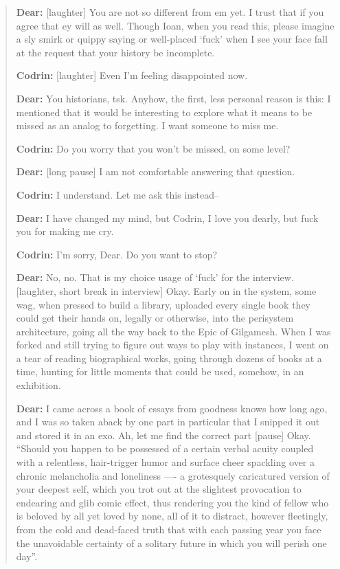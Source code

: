 \begin{quote}
\textbf{Dear:} {[}laughter{]} You are not so different from em yet. I trust that if you agree that ey will as well. Though Ioan, when you read this, please imagine a sly smirk or quippy saying or well-placed `fuck' when I see your face fall at the request that your history be incomplete.

\textbf{Codrin:} {[}laughter{]} Even I'm feeling disappointed now.

\textbf{Dear:} You historians, tsk. Anyhow, the first, less personal reason is this: I mentioned that it would be interesting to explore what it means to be missed as an analog to forgetting. I want someone to miss me.

\textbf{Codrin:} Do you worry that you won't be missed, on some level?

\textbf{Dear:} {[}long pause{]} I am not comfortable answering that question.

\textbf{Codrin:} I understand. Let me ask this instead--

\textbf{Dear:} I have changed my mind, but Codrin, I love you dearly, but fuck you for making me cry.

\textbf{Codrin:} I'm sorry, Dear. Do you want to stop?

\textbf{Dear:} No, no. That is my choice usage of `fuck' for the interview. {[}laughter, short break in interview{]} Okay. Early on in the system, some wag, when pressed to build a library, uploaded every single book they could get their hands on, legally or otherwise, into the perisystem architecture, going all the way back to the Epic of Gilgamesh. When I was forked and still trying to figure out ways to play with instances, I went on a tear of reading biographical works, going through dozens of books at a time, hunting for little moments that could be used, somehow, in an exhibition.

\textbf{Dear:} I came across a book of essays from goodness knows how long ago, and I was so taken aback by one part in particular that I snipped it out and stored it in an exo. Ah, let me find the correct part {[}pause{]} Okay. ``Should you happen to be possessed of a certain verbal acuity coupled with a relentless, hair-trigger humor and surface cheer spackling over a chronic melancholia and loneliness —- a grotesquely caricatured version of your deepest self, which you trot out at the slightest provocation to endearing and glib comic effect, thus rendering you the kind of fellow who is beloved by all yet loved by none, all of it to distract, however fleetingly, from the cold and dead-faced truth that with each passing year you face the unavoidable certainty of a solitary future in which you will perish one day''.


\end{quote}
